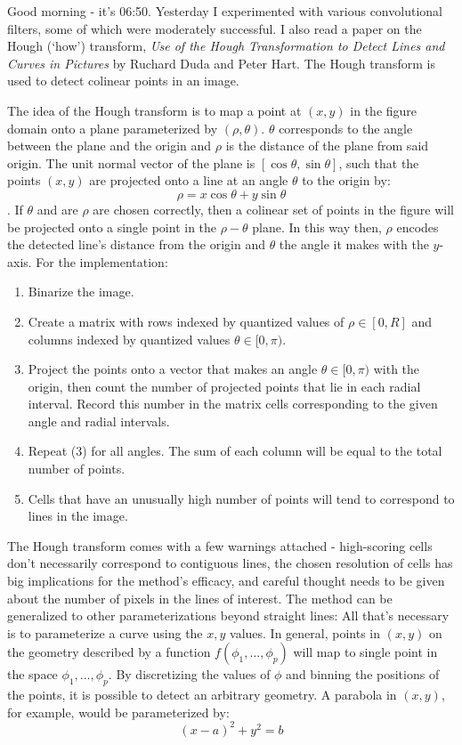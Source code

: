 \documentclass[idxtotoc,hyperref,openany]{labbook} %
\begin{document}
Good morning - it's 06:50. Yesterday I experimented with various convolutional filters, some of which were moderately successful. I also read a paper on the Hough (`how') transform, \emph{Use of the Hough Transformation to Detect Lines and Curves in Pictures} by Ruchard Duda and Peter Hart. The Hough transform is used to detect colinear points in an image.

 The idea of the Hough transform is to map a point at $(x, y)$ in the figure domain onto a plane parameterized by $(\rho, \theta)$. $\theta$ corresponds to the angle between the plane and the origin and $\rho$ is the distance of the plane from said origin. The unit normal vector of the plane is $[\cos\theta, \sin\theta]$, such that the points $(x, y)$ are projected onto a line at an angle $\theta$ to the origin by:
\[
	\rho = x\cos\theta + y\sin\theta 
\]
. If $\theta$ and are $\rho$ are chosen correctly, then a colinear set of points in the figure will be projected onto a single point in the $\rho-\theta$ plane. In this way then, $\rho$ encodes the detected line's distance from the origin and $\theta$ the angle it makes with the $y$-axis. For the implementation:
\begin{enumerate}
\item Binarize the image.
\item Create a matrix with rows indexed by quantized values of  $\rho \in [0, R]$ and columns indexed by quantized values $\theta \in [0, \pi)$.
\item Project the points onto a vector that makes an angle $\theta \in [0, \pi)$ with the origin, then count the number of projected points that lie in each radial interval. Record this number in the matrix cells corresponding to the given angle and radial intervals.
\item Repeat (3) for all angles. The sum of each column will be equal to the total number of points.
\item Cells that have an unusually high number of points will tend to correspond to lines in the image.
\end{enumerate}
The Hough transform comes with a few warnings attached - high-scoring cells don't necessarily correspond to contiguous lines, the chosen resolution of cells has big implications for the method's efficacy, and careful thought needs to be given about the number of pixels in the lines of interest. The method can be generalized to other parameterizations beyond straight lines: All that's necessary is to parameterize a curve using the $x, y$ values. In general, points in $(x,y)$ on the geometry described by a function $f(\phi_1, ..., \phi_p)$ will map to single point in the space $\phi_1, ..., \phi_p$. By discretizing the values of $\phi$ and binning the positions of the points, it is possible to detect an arbitrary geometry. A parabola in $(x, y)$, for example, would be parameterized by:
\[
	(x - a)^2 + y^2 = b
\]
\end{document}
